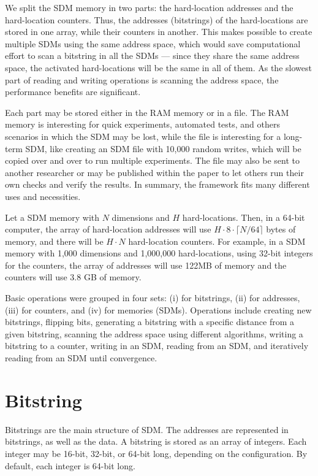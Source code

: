 We split the SDM memory in two parts: the hard-location addresses and the hard-location counters. Thus, the addresses (bitstrings) of the hard-locations are stored in one array, while their counters in another. This makes possible to create multiple SDMs using the same address space, which would save computational effort to scan a bitstring in all the SDMs --- since they share the same address space, the activated hard-locations will be the same in all of them. As the slowest part of reading and writing operations is scanning the address space, the performance benefits are significant.

Each part may be stored either in the RAM memory or in a file. The RAM memory is interesting for quick experiments, automated tests, and others scenarios in which the SDM may be lost, while the file is interesting for a long-term SDM, like creating an SDM file with 10,000 random writes, which will be copied over and over to run multiple experiments. The file may also be sent to another researcher or may be published within the paper to let others run their own checks and verify the results. In summary, the framework fits many different uses and necessities.

Let a SDM memory with $N$ dimensions and $H$ hard-locations. Then, in a 64-bit computer, the array of hard-location addresses will use $H \cdot 8 \cdot \lceil N/64 \rceil$ bytes of memory, and there will be $H \cdot N$ hard-location counters. For example, in a SDM memory with 1,000 dimensions and 1,000,000 hard-locations, using 32-bit integers for the counters, the array of addresses will use 122MB of memory and the counters will use 3.8 GB of memory.

Basic operations were grouped in four sets: (i) for bitstrings, (ii) for addresses, (iii) for counters, and (iv) for memories (SDMs). Operations include creating new bitstrings, flipping bits, generating a bitstring with a specific distance from a given bitstring, scanning the address space using different algorithms, writing a bitstring to a counter, writing in an SDM, reading from an SDM, and iteratively reading from an SDM until convergence.


\section{Bitstring}

Bitstrings are the main structure of SDM. The addresses are represented in bitstrings, as well as the data. A bitstring is stored as an array of integers. Each integer may be 16-bit, 32-bit, or 64-bit long, depending on the configuration. By default, each integer is 64-bit long.

